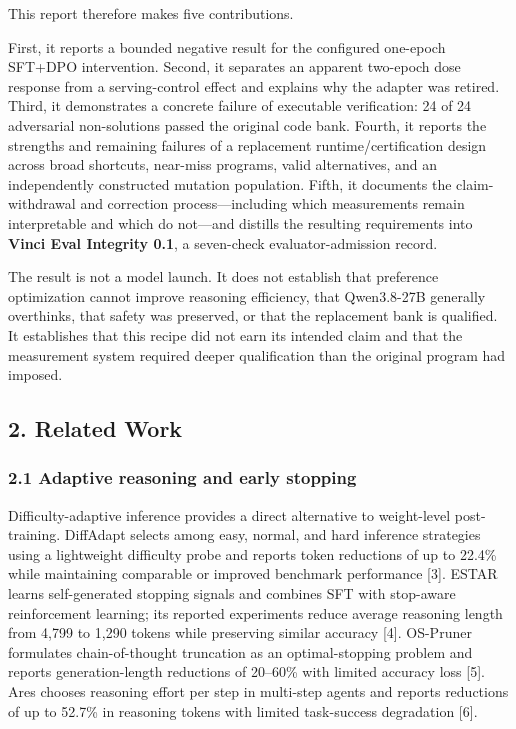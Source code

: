 \documentclass[
]{article}
\begin{document}
This report therefore makes five contributions.

First, it reports a bounded negative result for the configured one-epoch
SFT+DPO intervention. Second, it separates an apparent two-epoch dose
response from a serving-control effect and explains why the adapter was
retired. Third, it demonstrates a concrete failure of executable
verification: 24 of 24 adversarial non-solutions passed the original
code bank. Fourth, it reports the strengths and remaining failures of a
replacement runtime/certification design across broad shortcuts,
near-miss programs, valid alternatives, and an independently constructed
mutation population. Fifth, it documents the claim-withdrawal and
correction process---including which measurements remain interpretable
and which do not---and distills the resulting requirements into
\textbf{Vinci Eval Integrity 0.1}, a seven-check evaluator-admission
record.

The result is not a model launch. It does not establish that preference
optimization cannot improve reasoning efficiency, that Qwen3.8-27B
generally overthinks, that safety was preserved, or that the replacement
bank is qualified. It establishes that this recipe did not earn its
intended claim and that the measurement system required deeper
qualification than the original program had imposed.

\subsection{2. Related Work}\label{2-related-work}

\subsubsection{2.1 Adaptive reasoning and early
stopping}\label{21-adaptive-reasoning-and-early-stopping}

Difficulty-adaptive inference provides a direct alternative to
weight-level post-training. DiffAdapt selects among easy, normal, and
hard inference strategies using a lightweight difficulty probe and
reports token reductions of up to 22.4\% while maintaining comparable or
improved benchmark performance {[}3{]}. ESTAR learns self-generated
stopping signals and combines SFT with stop-aware reinforcement
learning; its reported experiments reduce average reasoning length from
4,799 to 1,290 tokens while preserving similar accuracy {[}4{]}.
OS-Pruner formulates chain-of-thought truncation as an optimal-stopping
problem and reports generation-length reductions of 20--60\% with
limited accuracy loss {[}5{]}. Ares chooses reasoning effort per step in
multi-step agents and reports reductions of up to 52.7\% in reasoning
tokens with limited task-success degradation {[}6{]}.
\end{document}
